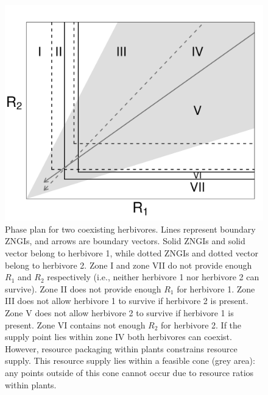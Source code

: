 \documentclass[12pt]{article}
\begin{document}
\begin{figure}[h]
\includegraphics[width=16 cm, keepaspectratio]{Coexistence2Herbivores}
\caption{Phase plan for two coexisting herbivores. Lines represent boundary ZNGIs, and arrows are boundary vectors. %
Solid ZNGIs and solid vector belong to herbivore 1, while dotted ZNGIs and dotted vector belong to herbivore 2. Zone I and zone VII do not provide enough $R_1$ and $R_2$ respectively (i.e., neither herbivore 1 nor herbivore 2 can survive). Zone II does not provide enough $R_1$ for herbivore 1. Zone III does not allow herbivore 1 to survive if herbivore 2 is present. Zone V does not allow herbivore 2 to survive if herbivore 1 is present. Zone VI contains not enough $R_2$ for herbivore 2. If the supply point lies within zone IV both herbivores can coexist. However, resource packaging within plants constrains resource supply. This resource supply lies within a feasible cone (grey area): any points outside of this cone cannot occur due to resource ratios within plants. %
}
\label{Coexistence}
\end{figure}
\end{document}
